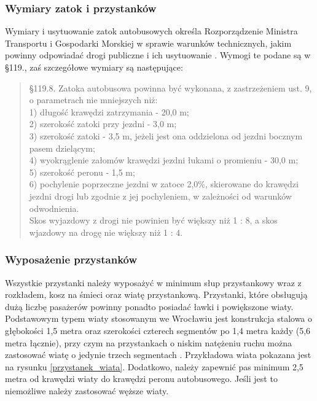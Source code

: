 \documentclass[twoside,12pt]{article}
\begin{document}
	\subsubsection{Wymiary zatok i przystanków}

	Wymiary i usytuowanie zatok autobusowych określa Rozporządzenie Ministra Transportu i Gospodarki Morskiej w sprawie warunków technicznych, jakim powinny odpowiadać drogi publiczne i ich usytuowanie \cite{rozporzadzenie_drogi}. Wymogi te podane są w §119., zaś szczegółowe wymiary są następujące:
	\begin{quote}
	§119.8. Zatoka autobusowa powinna być wykonana, z zastrzeżeniem ust. 9, o parametrach nie mniejszych niż: \\
1)	długość krawędzi zatrzymania - 20,0 m; \\
2)	szerokość zatoki przy jezdni - 3,0 m; \\
3)	szerokość zatoki - 3,5 m, jeżeli jest ona oddzielona od jezdni bocznym pasem dzielącym; \\
4)	wyokrąglenie załomów krawędzi jezdni łukami o promieniu - 30,0 m; \\
5)	szerokość peronu - 1,5 m; \\
6)	pochylenie poprzeczne jezdni w zatoce 2,0\%, skierowane do krawędzi jezdni drogi lub zgodnie z jej pochyleniem, w zależności od warunków odwodnienia. \\
Skos wyjazdowy z drogi nie powinien być większy niż 1 : 8, a skos wjazdowy na drogę nie większy niż 1 : 4. \\
	\end{quote}%
	
	\subsubsection{Wyposażenie przystanków}
	
	Wszystkie przystanki należy wyposażyć w minimum słup przystankowy wraz z rozkładem, kosz na śmieci oraz wiatę przystankową. Przystanki, które obsługują dużą liczbę pasażerów powinny ponadto posiadać ławki i powiększone wiaty. Podstawowym typem wiaty stosowanym we Wrocławiu jest konstrukcja stalowa o głębokości 1,5 metra oraz szerokości czterech segmentów po 1,4 metra każdy (5,6 metra łącznie), przy czym na przystankach o niskim natężeniu ruchu można zastosować wiatę o jedynie trzech segmentach \cite{standardy_wroclaw}. Przykładowa wiata pokazana jest na rysunku \ref{przystanek_wiata}. Dodatkowo, należy zapewnić pas minimum 2,5 metra od krawędzi wiaty do krawędzi peronu autobusowego. Jeśli jest to niemożliwe należy zastosować węższe wiaty. 
	
\end{document}

